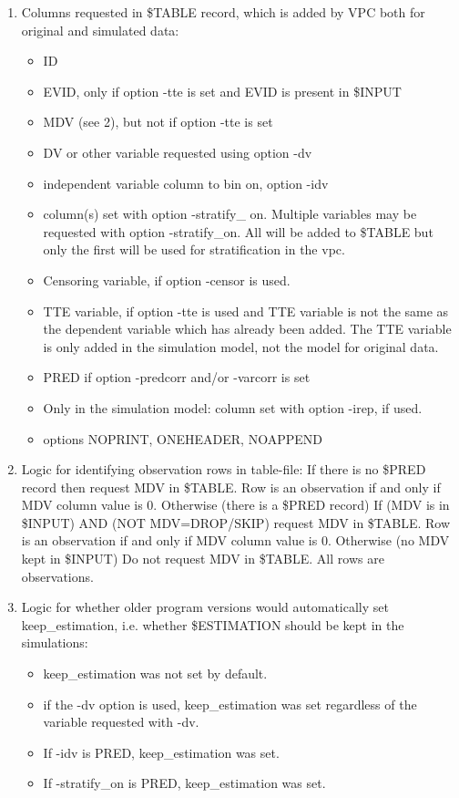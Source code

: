 \begin{enumerate}
	\item Columns requested in \$TABLE record, which is added by VPC both for original and simulated data:
	\begin{itemize}
		\item ID
		\item EVID, only if option -tte is set and EVID is present in \$INPUT
		\item MDV (see 2), but not if option -tte is set
		\item DV or other variable requested using option -dv
		\item independent variable column to bin on, option -idv
		\item column(s) set with option  -stratify\_ on. Multiple variables may be requested with option -stratify\_on. All will be added to \$TABLE but only the first will be used for stratification in the vpc.
		\item Censoring variable, if option -censor is used.
		\item TTE variable, if option -tte is used and TTE variable is not the same as the dependent variable which has already been added. The TTE variable is only added in the simulation model, not the model for original data.
        \item PRED if option -predcorr and/or -varcorr is set
        \item Only in the simulation model: column set with option -irep, if used.
		\item options NOPRINT, ONEHEADER, NOAPPEND
	\end{itemize}
	\item Logic for identifying observation rows  in table-file:
If there is no \$PRED record
	then request MDV in \$TABLE. Row is an observation if and only if MDV column value is 0.
Otherwise (there is a \$PRED record)
	If (MDV is in \$INPUT) AND (NOT MDV=DROP/SKIP)
		request MDV in \$TABLE. Row is an observation if and only if MDV column value is 0.
	Otherwise (no MDV kept in \$INPUT)
		Do not request MDV in \$TABLE. All rows are observations.
	\item Logic for whether older program versions would automatically set keep\_estimation, i.e. whether \$ESTIMATION should be kept in the simulations:
	\begin{itemize}
		\item keep\_estimation was not set by default.
		\item if the -dv option is used, keep\_estimation was set regardless of the variable requested with -dv.
		\item If -idv is PRED, keep\_estimation was set.
		\item If -stratify\_on is PRED, keep\_estimation was set.
	\end{itemize}
\end{enumerate}

